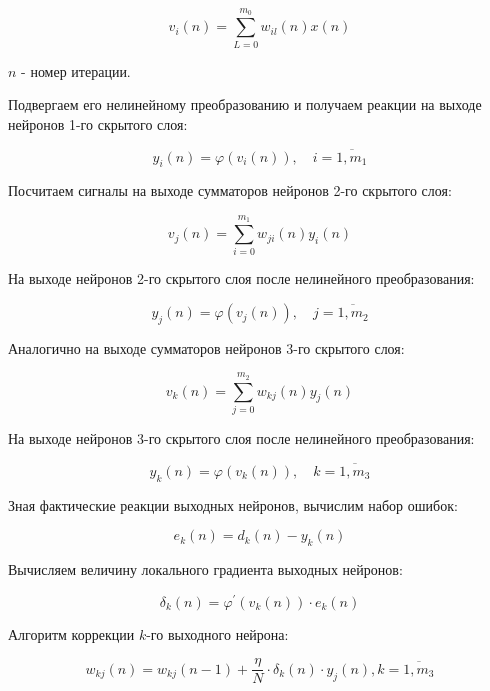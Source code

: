 \documentclass{article}
\numberwithin{equation}{subsection}
\begin{document}
\begin{equation}
    v_i (n) = \sum_{L=0}^{m_{0}} w_{il}(n) x(n)
\end{equation}

\noindent
$n$ - номер итерации.

Подвергаем его нелинейному преобразованию и получаем реакции на выходе нейронов 1-го скрытого слоя:

\begin{equation}
    y_i(n) = \varphi (v_i(n)), \quad i=\overline{1,m_1}
\end{equation}

Посчитаем сигналы на выходе сумматоров нейронов 2-го скрытого слоя:

\begin{equation}
    v_j (n) = \sum_{i=0}^{m_{1}} w_{ji}(n) y_i(n)
\end{equation}

На выходе нейронов 2-го скрытого слоя после нелинейного преобразования:

\begin{equation}
    y_j(n) = \varphi (v_j(n)), \quad j=\overline{1,m_2}
\end{equation}

Аналогично на выходе сумматоров нейронов 3-го скрытого слоя:

\begin{equation}
    v_k (n) = \sum_{j=0}^{m_{2}} w_{kj}(n) y_j(n)
\end{equation}

На выходе нейронов 3-го скрытого слоя после нелинейного преобразования:

\begin{equation}
    y_k(n) = \varphi (v_k(n)), \quad k=\overline{1,m_3}
\end{equation}

Зная фактические реакции выходных нейронов, вычислим набор ошибок:

\begin{equation}
    e_{k}(n) = d_k(n) - y_k(n)
\end{equation}

Вычисляем величину локального градиента выходных нейронов:

\begin{equation}
    \delta_k(n) = \varphi^{\prime}(v_k(n))\cdot e_k(n)
\end{equation}

Алгоритм коррекции $k$-го выходного нейрона:

\begin{equation}
    w_{kj}(n) = w_{kj}(n-1) + \dfrac{\eta}{N} \cdot \delta_{k}(n) \cdot y_j(n), k=\overline{1,m_3}
\end{equation}
\end{document}
